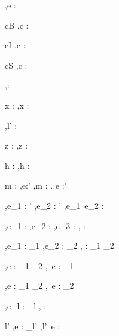 


  {\Gamma,\Sigma \infers e : \tau}


  {c\in B}
  {\Gamma,\Sigma \infers c : \Bool}
  {}

  {c\in I}
  {\Gamma,\Sigma \infers c : \Int}
  {}

  {c\in S}
  {\Gamma,\Sigma \infers c : \String}
  {}


  {}
  {\Gamma,\Sigma \infers \unit : \Unit}
  {}


  {x : \tau \in \Gamma}
  {\Gamma,\Sigma \infers x : \tau}
  {}

  {}
  {\Gamma,\Sigma \infers l' \As {} : }
  {}

  {z : \beta \in \Gamma}
  {\Gamma,\Sigma \infers z : \beta}
  {}

  {h : \beta \in \Sigma}
  {\Gamma,\Sigma \infers h : \Reference \beta}
  {}


  {\infers m : \tau \To \Delta \Quad
   \Gamma \cup \Delta,\Sigma \infers e:\tau'}
  {\Gamma,\Sigma \infers \lambda m : \tau . e :\tau \to \tau'}
  {}

  {\Gamma,\Sigma \infers e_1 : \tau' \to \tau \Quad
   \Gamma,\Sigma \infers e_2 : \tau'}
  {\Gamma,\Sigma \infers e_1\ e_2 : \tau}
  {}


  {\Gamma,\Sigma \infers e_1 : \Bool \Quad
   \Gamma,\Sigma \infers e_2 : \tau \Quad
   \Gamma,\Sigma \infers e_3 : \tau}
  {\Gamma,\Sigma \infers {} : \tau}
  {}


    {\Gamma,\Sigma \infers e_1 : \tau_1  \Quad
     \Gamma,\Sigma \infers e_2 : \tau_2}
    {\Gamma,\Sigma \infers {} : \tau_1 \times \tau_2}
    {}

  {\Gamma,\Sigma \infers e : \tau_1 \times \tau_2}
  {\Gamma,\Sigma \infers \Fst\ e : \tau_1}
  {}

  {\Gamma,\Sigma \infers e : \tau_1 \times \tau_2}
  {\Gamma,\Sigma \infers \Snd\ e : \tau_2}
  {}

  { \Quad
   \Gamma,\Sigma \infers e_l : \tau_l}
  {\Gamma,\Sigma \infers {} : }
  {}


  {l' \in {} \Quad
   \Gamma,\Sigma \infers e : \tau_{l'}}
  {\Gamma,\Sigma \infers l'\ e \As {} : }
  {}

